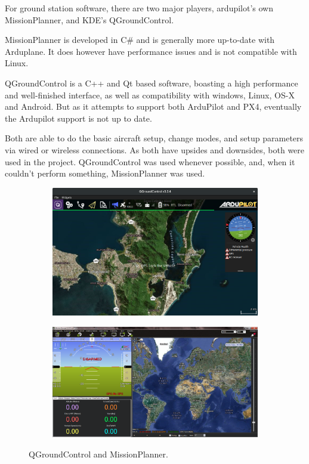 For ground station software, there are two major players, ardupilot's own MissionPlanner, and KDE's QGroundControl.

MissionPlanner is developed in C\# and is generally more up-to-date with Arduplane.
%
It does however have performance issues and is not compatible with Linux.
%

QGroundControl is a C++ and Qt based software, boasting a high performance and well-finished interface, as well as compatibility with windows, Linux, OS-X and Android. But as it attempts to support both ArduPilot and PX4, eventually the Ardupilot support is not up to date.
%

Both are able to do the basic aircraft setup, change modes, and setup parameters via wired or wireless connections. As both have upsides and downsides, both were used in the project. QGroundControl was used whenever possible, and, when it couldn't perform something, MissionPlanner was used.


\begin{figure}[h]
  \centering
  \begin{subfigure}{.8\textwidth}
    \centering
    \includegraphics[width=\linewidth]{figs/qgc.png}
  \end{subfigure}%

  \begin{subfigure}{.8\textwidth}
    \centering
    \includegraphics[width=\linewidth]{figs/missionplanner.png}

  \end{subfigure}
  \caption{QGroundControl and MissionPlanner.}
  \label{fig:motorcurves}
\end{figure}